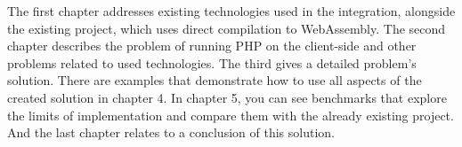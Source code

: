 The first chapter addresses existing technologies used in the integration, alongside the existing project, which uses direct compilation to WebAssembly.
The second chapter describes the problem of running PHP on the client-side and other problems related to used technologies.
The third gives a detailed problem's solution.
There are examples that demonstrate how to use all aspects of the created solution in chapter 4.
In chapter 5, you can see benchmarks that explore the limits of implementation and compare them with the already existing project.
And the last chapter relates to a conclusion of this solution. 